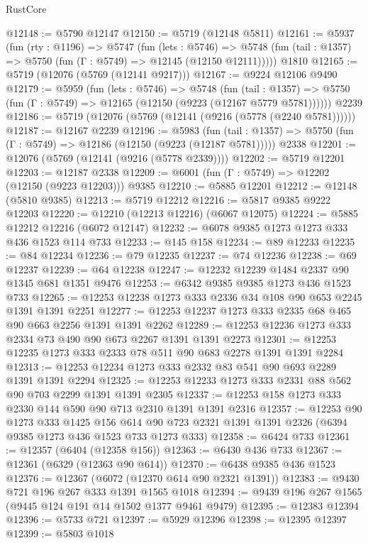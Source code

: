 \begin{lexlean}{RustCore}
\begin{coremodule}
@12148 := @5790 @12147
@12150 := @5719 (@12148 @5811)
@12161 := @5937
    (fun (rty : @1196) =>
    @5747
      (fun (lets : @5746) =>
      @5748 (fun (tail : @1357) => @5750 (fun (Γ : @5749) => @12145 (@12150 @12111)))))
    @1810
@12165 := @5719 (@12076 (@5769 (@12141 @9217)))
@12167 := @9224 @12106 @9490
@12179 := @5959
    (fun (lets : @5746) =>
    @5748
      (fun (tail : @1357) =>
      @5750 (fun (Γ : @5749) => @12165 (@12150 (@9223 (@12167 @5779 @5781))))))
    @2239
@12186 := @5719 (@12076 (@5769 (@12141 (@9216 (@5778 (@2240 @5781))))))
@12187 := @12167 @2239
@12196 := @5983
    (fun (tail : @1357) => @5750 (fun (Γ : @5749) => @12186 (@12150 (@9223 (@12187 @5781)))))
    @2338
@12201 := @12076 (@5769 (@12141 (@9216 (@5778 @2339))))
@12202 := @5719 @12201
@12203 := @12187 @2338
@12209 := @6001 (fun (Γ : @5749) => @12202 (@12150 (@9223 @12203))) @9385
@12210 := @5885 @12201
@12212 := @12148 (@5810 @9385)
@12213 := @5719 @12212
@12216 := @5817 @9385 @9222 @12203
@12220 := @12210 (@12213 @12216) (@6067 @12075)
@12224 := @5885 @12212 @12216 (@6072 @12147)
@12232 := @6078 @9385 @1273 @1273 @333 @436 @1523 @114 @733
@12233 := @145 @158
@12234 := @89 @12233
@12235 := @84 @12234
@12236 := @79 @12235
@12237 := @74 @12236
@12238 := @69 @12237
@12239 := @64 @12238
@12247 := @12232 @12239 @1484 @2337 @90 @1345 @681 @1351 @9476
@12253 := @6342 @9385 @9385 @1273 @436 @1523 @733
@12265 := @12253 @12238 @1273 @333 @2336 @34 @108 @90 @653 @2245 @1391 @1391 @2251
@12277 := @12253 @12237 @1273 @333 @2335 @68 @465 @90 @663 @2256 @1391 @1391 @2262
@12289 := @12253 @12236 @1273 @333 @2334 @73 @490 @90 @673 @2267 @1391 @1391 @2273
@12301 := @12253 @12235 @1273 @333 @2333 @78 @511 @90 @683 @2278 @1391 @1391 @2284
@12313 := @12253 @12234 @1273 @333 @2332 @83 @541 @90 @693 @2289 @1391 @1391 @2294
@12325 := @12253 @12233 @1273 @333 @2331 @88 @562 @90 @703 @2299 @1391 @1391 @2305
@12337 := @12253 @158 @1273 @333 @2330 @144 @590 @90 @713 @2310 @1391 @1391 @2316
@12357 := @12253
    @90
    @1273
    @333
    @1425
    @156
    @614
    @90
    @723
    @2321
    @1391
    @1391
    @2326
    (@6394 @9385 @1273 @436 @1523 @733 @1273 @333)
@12358 := @6424 @733
@12361 := @12357 (@6404 (@12358 @156))
@12363 := @6430 @436 @733
@12367 := @12361 (@6329 (@12363 @90 @614))
@12370 := @6438 @9385 @436 @1523
@12376 := @12367 (@6072 (@12370 @614 @90 @2321 @1391))
@12383 := @9430 @721 @196 @267 @333 @1391 @1565 @1018
@12394 := @9439 @196 @267 @1565 (@9445 @124 @191 @14 @1502 @1377 @9461 @9479)
@12395 := @12383 @12394
@12396 := @5733 @721
@12397 := @5929 @12396
@12398 := @12395 @12397
@12399 := @5803 @1018

\end{coremodule}
\end{lexlean}
